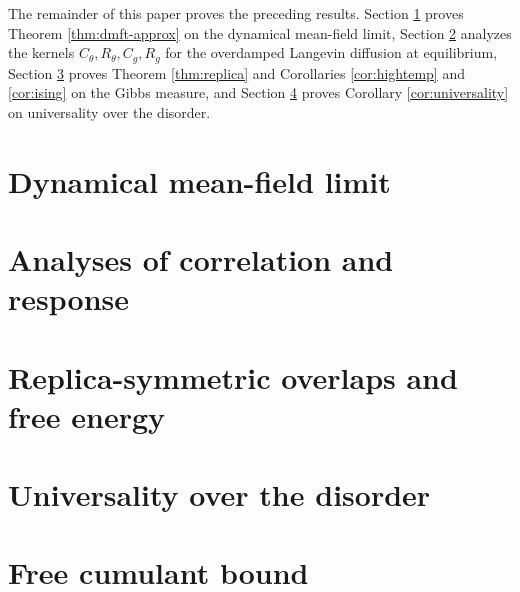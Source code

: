 \documentclass[11pt,letterpaper,reqno]{amsart}
\theoremstyle{definition}
\numberwithin{equation}{section}
\begin{document}
The remainder of this paper proves the preceding results. Section \ref{sec:dmft-approx} proves Theorem \ref{thm:dmft-approx} on the dynamical mean-field limit, Section \ref{sec:corrresponse} analyzes the kernels $C_\theta,R_\theta,C_g,R_g$ for the overdamped Langevin diffusion at equilibrium, Section \ref{sec:replica} proves Theorem \ref{thm:replica} and Corollaries \ref{cor:hightemp} and \ref{cor:ising} on the Gibbs measure, and Section \ref{sec:universality} proves Corollary \ref{cor:universality} on universality over the disorder.

\section{Dynamical mean-field limit}\label{sec:dmft-approx}



\section{Analyses of correlation and response}\label{sec:corrresponse}



\section{Replica-symmetric overlaps and free energy}\label{sec:replica}



\section{Universality over the disorder}\label{sec:universality}



\appendix

\section{Free cumulant bound}
\end{document}

